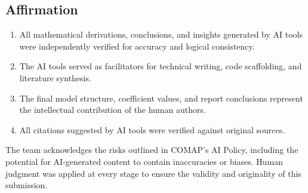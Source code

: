 \documentclass[12pt]{article}
\begin{document}
\subsection*{Affirmation}
\begin{enumerate}
    \item All mathematical derivations, conclusions, and insights generated by AI tools were independently verified for accuracy and logical consistency.
    \item The AI tools served as facilitators for technical writing, code scaffolding, and literature synthesis.
    \item The final model structure, coefficient values, and report conclusions represent the intellectual contribution of the human authors.
    \item All citations suggested by AI tools were verified against original sources.
\end{enumerate}

The team acknowledges the risks outlined in COMAP's AI Policy, including the potential for AI-generated content to contain inaccuracies or biases. Human judgment was applied at every stage to ensure the validity and originality of this submission.
\end{document}
